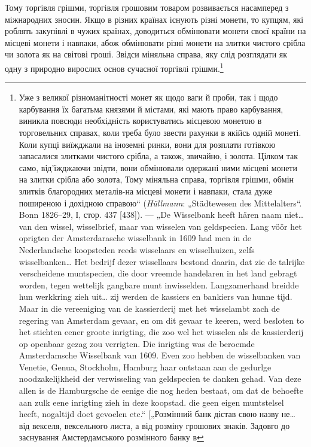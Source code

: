 Тому торгівля грішми, торгівля грошовим товаром розвивається
насамперед з міжнародних зносин. Якщо в різних країнах
існують різні монети, то купцям, які роблять закупівлі в чужих
країнах, доводиться обмінювати монети своєї країни на місцеві
монети і навпаки, абож обмінювати різні монети на злитки чистого
срібла чи золота як на світові гроші. Звідси міняльна справа, яку
слід розглядати як одну з природно вирослих основ сучасної торгівлі
грішми.\footnote{
Уже з великої різноманітності монет як щодо ваги й проби, так і щодо
карбування їх багатьма князями й містами, які мають право карбування, виникла
повсюди необхідність користуватись місцевою монетою в торговельних справах,
коли треба було звести рахунки в якійсь одній монеті. Коли купці
виїжджали на іноземні ринки, вони для розплати готівкою запасалися злитками
чистого срібла, а також, звичайно, і золота. Цілком так само, від’їжджаючи
звідти, вони обмінювали одержані ними місцеві монети на злитки
срібла або золота, Тому міняльна справа, торгівля грішми, обмін злитків благородних
металів-на місцеві монети і навпаки, стала дуже поширеною і дохідною
справою“ (\emph{Hüllmann}: „Städtewesen des Mittelalters“. Bonn 1826--29,
І, стор. 437 [438]). — „De Wisselbank heeft hären naam niet\dots{} van den wissel, wisselbrief,
maar van wisselen van geldspecien. Lang vöör het oprigten der Amsterdarasche
wisselbank in 1609 had men in de Nederlandsche koopsteden reeds wisselaars
en wisselhuizen, zelfs wisselbanken\dots{} Het bedrijf dezer wissellaars bestond
daarin, dat zie de talrijke verscheidene muntspecien, die door vreemde handelaren
in het land gebragt worden, tegen wettelijk gangbare munt inwisselden. Langzamerhand
breidde hun werkkring zieh uit\dots{} zij werden de kassiers en bankiers van
hunne tijd. Maar in die vereeniging van de kassierderij met het wisselambt zach
de regering van Amsterdam gevaar, en om dit gevaar te keeren, werd besloten to
het stichten eener groote inrigting, die zoo wel het wisselen als de kassierderij op
openbaar gezag zou verrigten. Die inrigting was de beroemde Amsterdamsche Wisselbank
van 1609. Even zoo hebben de wisselbanken van Venetie, Genua, Stockholm,
Hamburg haar ontstaan aan de gedurlge noodzakelijkheid der verwisseling van
geldspecien te danken gehad. Van deze allen is de Hamburgsche de eenige die
nog heden bestaat, om dat de behoefte aan zulk eene inrigting zieh in deze
koopstad. die geen eigen muntstelsel heeft, nogaltijd doet gevoelen etc.“ [„Розмінний
банк дістав свою назву не\dots{} від векселя, вексельного листа, а від розміну
грошових знаків. Задовго до заснування Амстердамського розмінного банку в
}
